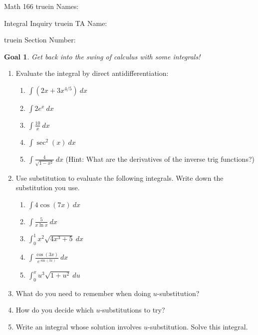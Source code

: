\documentclass[12pt]{article}
\newtheorem*{goal}{Goal}
\begin{document}
\pagestyle{empty} %

\noindent
{Math 166    truein  Names:\ \hrulefill}

\noindent
{Integral Inquiry  truein  TA Name:\ \hrulefill}

  truein  Section Number:\ \hrulefill
\medskip

\begin{goal} \rm
Get back into the swing of calculus with some integrals!
\end{goal}
\smallskip

\begin{enumerate}
\item Evaluate the integral by direct antidifferentiation: 
\begin{enumerate}
\item
$\displaystyle\int \left(2x + 3x^{4/5}\right) \ dx$
\vfill
\item
$\displaystyle\int 2e^x \ dx$
\vfill
 \item
$\displaystyle\int \displaystyle\frac{10}{x} \ dx$
\vfill
\item
$\displaystyle\int \sec^2(x) \ dx$
\vfill
\item
$\displaystyle\int \displaystyle\frac{4}{\sqrt{1-x^2}}  \ dx$ (Hint: What are the derivatives of the inverse trig functions?)
\vfill
\end{enumerate}

\newpage

\item Use substitution to evaluate the following integrals. Write down the substitution you use.
\begin{enumerate}
\item $\displaystyle\int 4\cos(7x) \ dx$

\vspace{1.75in}

\item $\displaystyle\int \displaystyle\frac{5}{x \ln x} \ dx$

\vspace{1.75in}

\item $\displaystyle\int_0^1 x^2 \sqrt{4x^3+5} \ dx$

\vspace{1.75in}

\item $\displaystyle\int \displaystyle\frac{\cos(3x)}{e^{\sin(3x)}}\ dx$
\vfill
\newpage
\item $\displaystyle \int_0^x u^3 \sqrt{1 + u^2} \ du$
\vfill
\vfill
\end{enumerate} 

\item What do you need to remember when doing $u$-substitution? 
\vfill
\item How do you decide which $u$-substitutions to try?
\vfill

\item Write an integral whose solution involves $u$-substitution. Solve this integral.
\vfill
\vfill
\end{enumerate} 
\end{document}
